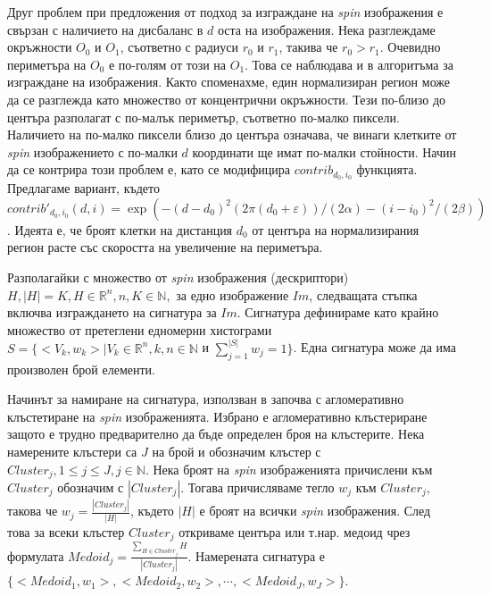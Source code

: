 \documentclass[a4paper,12pt]{article}
\begin{document}
Друг проблем при предложения от \cite{spinimages} подход за изграждане на \textit{spin} изображения е свързан с наличието на дисбаланс в $d$ оста на изображения. Нека разглеждаме окръжности $O_0$ и $O_1$, съответно с радиуси $r_0$ и $r_1$, такива че $r_0 > r_1$. Очевидно периметъра на $O_0$ е по-голям от този на $O_1$. Това се наблюдава и в алгоритъма за изграждане на \cite{spinimages} изображения. Както споменахме, един нормализиран регион може да се разглежда като множество от концентрични окръжности. Тези по-близо до центъра разполагат с по-малък периметър, съответно по-малко пиксели. Наличието на по-малко пиксели близо до центъра означава, че винаги клетките от \textit{spin} изображението с по-малки $d$ координати ще имат по-малки стойности. Начин да се контрира този проблем е, като се модифицира $contrib_{d_0,i_0}$ функцията. Предлагаме вариант, където $contrib'_{d_0,i_0}(d, i) = \exp(-(d-d_0)^2(2\pi(d_0+\varepsilon))/(2\alpha) - (i-i_0)^2/(2\beta))$. Идеята е, че броят клетки на дистанция $d_0$ от центъра на нормализирания регион расте със скоростта на увеличение на периметъра.

\bigbreak

Разполагайки с множество от \textit{spin} изображения (дескриптори) $H, |H|=K, H \in \mathbb{R}^n, n, K \in \mathbb{N},$ за едно изображение $Im$, следващата стъпка включва изграждането на сигнатура за $Im$. Сигнатура дефинираме като крайно множество от претеглени едномерни хистограми $S = \{<V_k, w_k> | V_k \in \mathbb{R}^n, k,n \in \mathbb{N} $ и $\sum_{j=1}^{|S|} w_j = 1 \}$. Една сигнатура може да има произволен брой елементи.

\bigbreak

Начинът за намиране на сигнатура, използван в \cite{spinimages} започва с агломеративно клъстетиране на \textit{spin} изображенията. Избрано е агломеративно клъстериране защото е трудно предварително да бъде определен броя на клъстерите. Нека намерените клъстери са $J$ на брой и обозначим клъстер с $Cluster_j, 1 \leq j \leq J, j \in \mathbb{N}$. Нека броят на \textit{spin} изображенията причислени към $Cluster_j$ обозначим с $|Cluster_j|$. Тогава причисляваме тегло $w_j$ към $Cluster_j$, такова че $w_j = \frac{|Cluster_j|}{|H|}$, където $|H|$ е броят на всички \textit{spin} изображения. След това за всеки клъстер $Cluster_j$ откриваме центъра или т.нар. медоид чрез формулата $Medoid_j = \frac{\sum_{H \in Cluster_j} H}{|Cluster_j|}$. Намерената сигнатура е $\{<Medoid_1, w_1>, <Medoid_2, w_2>, \cdots, <Medoid_J, w_J>\}$.

\bigbreak
\end{document}
